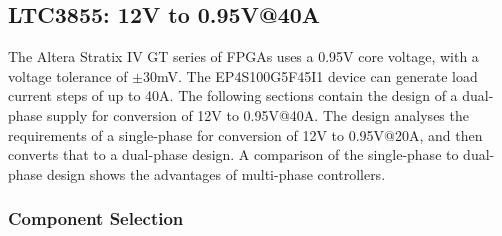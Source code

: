 \subsection{LTC3855: 12V to 0.95V@40A}
\label{sec:LTC3855}

The Altera Stratix IV GT series of FPGAs uses a 0.95V core voltage,
with a voltage tolerance of $\pm$30mV. The EP4S100G5F45I1 device 
can generate load current steps of up to 40A. The following
sections contain the design of a dual-phase supply for conversion
of 12V to 0.95V@40A. The design analyses the requirements of a
single-phase for conversion of 12V to 0.95V@20A, and then
converts that to a dual-phase design. A comparison of the
single-phase to dual-phase design shows the advantages of
multi-phase controllers.

\subsubsection{Component Selection}

